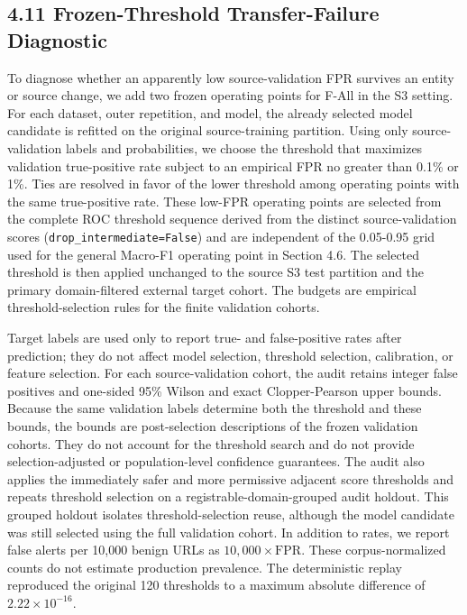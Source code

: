 \documentclass[
  10pt,
]{article}
\begin{document}
\subsection{4.11 Frozen-Threshold Transfer-Failure
Diagnostic}\label{frozen-threshold-transfer-failure-diagnostic}

To diagnose whether an apparently low source-validation FPR survives an
entity or source change, we add two frozen operating points for F-All in
the S3 setting. For each dataset, outer repetition, and model, the
already selected model candidate is refitted on the original
source-training partition. Using only source-validation labels and
probabilities, we choose the threshold that maximizes validation
true-positive rate subject to an empirical FPR no greater than 0.1\% or
1\%. Ties are resolved in favor of the lower threshold among operating
points with the same true-positive rate. These low-FPR operating points
are selected from the complete ROC threshold sequence derived from the
distinct source-validation scores (\texttt{drop\_intermediate=False})
and are independent of the 0.05-0.95 grid used for the general Macro-F1
operating point in Section 4.6. The selected threshold is then applied
unchanged to the source S3 test partition and the primary
domain-filtered external target cohort. The budgets are empirical
threshold-selection rules for the finite validation cohorts.

Target labels are used only to report true- and false-positive rates
after prediction; they do not affect model selection, threshold
selection, calibration, or feature selection. For each source-validation
cohort, the audit retains integer false positives and one-sided 95\%
Wilson and exact Clopper-Pearson upper bounds. Because the same
validation labels determine both the threshold and these bounds, the
bounds are post-selection descriptions of the frozen validation cohorts.
They do not account for the threshold search and do not provide
selection-adjusted or population-level confidence guarantees. The audit
also applies the immediately safer and more permissive adjacent score
thresholds and repeats threshold selection on a
registrable-domain-grouped audit holdout. This grouped holdout isolates
threshold-selection reuse, although the model candidate was still
selected using the full validation cohort. In addition to rates, we
report false alerts per 10,000 benign URLs as
\(10{,}000\times\mathrm{FPR}\). These corpus-normalized counts do not
estimate production prevalence. The deterministic replay reproduced the
original 120 thresholds to a maximum absolute difference of
\(2.22\times10^{-16}\).
\end{document}
